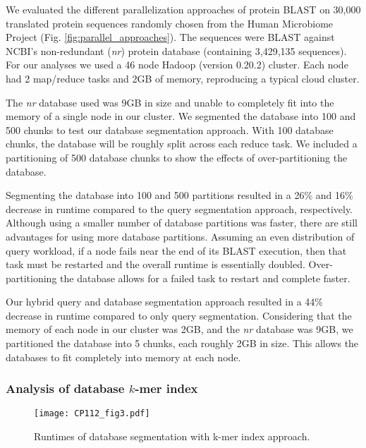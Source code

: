 We evaluated the different parallelization approaches of protein BLAST on 30,000 translated protein sequences randomly chosen from the Human Microbiome Project\cite{peterson2009nih} (Fig. \ref{fig:parallel_approaches}).
The sequences were BLAST against NCBI's non-redundant (\emph{nr}) protein database (containing 3,429,135 sequences).
For our analyses we used a 46 node Hadoop (version 0.20.2) cluster.  Each node had 2 map/reduce tasks and 2GB of memory, reproducing a typical cloud cluster.

The \emph{nr} database used was 9GB in size and unable to completely fit into the memory of a single node in our cluster.
We segmented the database into 100 and 500 chunks to test our database segmentation approach.
With 100 database chunks, the database will be roughly split across each reduce task.
We included a partitioning of 500 database chunks to show the effects of over-partitioning the database.

Segmenting the database into 100 and 500 partitions resulted in a 26\% and 16\% decrease in runtime compared to the query segmentation approach, respectively.
Although using a smaller number of database partitions was faster, there are still advantages for using more database partitions.
Assuming an even distribution of query workload, if a node fails near the end of its BLAST execution, then that task must be restarted and the overall runtime is essentially doubled.
Over-partitioning the database allows for a failed task to restart and complete faster.

Our hybrid query and database segmentation approach resulted in a 44\% decrease in runtime compared to only query segmentation.
Considering that the memory of each node in our cluster was 2GB, and the \emph{nr} database was 9GB, we partitioned the database into 5 chunks, each roughly 2GB in size.
This allows the databases to fit completely into memory at each node.

\subsubsection{Analysis of database $k$-mer index}


\begin{figure}[!htb]%
\begin{center}
\texttt{[image: CP112\_fig3.pdf]}
\end{center}
\renewcommand{\baselinestretch}{1}
\small\normalsize
\begin{quote}
\caption[Runtimes of database segmentation with k-mer index approach]{Runtimes of database segmentation with k-mer index approach.}
\label{fig:db_index}
\end{quote}
\end{figure}
\renewcommand{\baselinestretch}{2}
\small\normalsize


